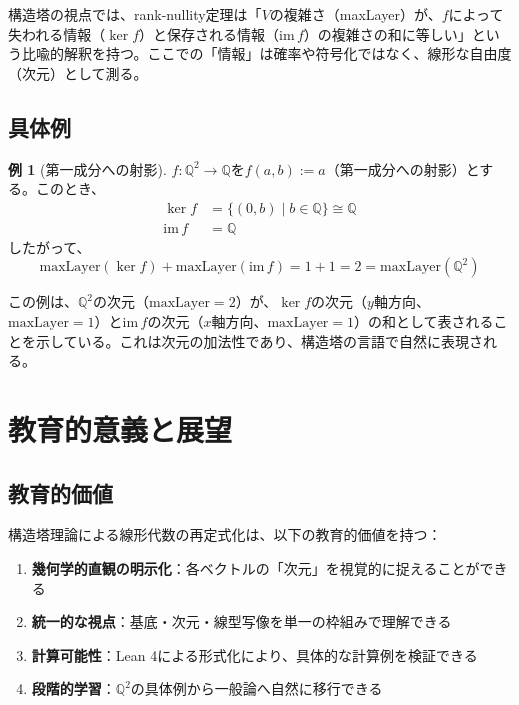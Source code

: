 \documentclass[a4paper,11pt]{ltjsarticle}
\theoremstyle{definition}
\newtheorem{example}[definition]{例}
\begin{document}
構造塔の視点では、rank-nullity定理は「$V$の複雑さ（maxLayer）が、$f$によって失われる情報（$\ker f$）と保存される情報（$\mathrm{im}\, f$）の複雑さの和に等しい」という比喩的解釈を持つ。ここでの「情報」は確率や符号化ではなく、線形な自由度（次元）として測る。

\subsection{具体例}

\begin{example}[第一成分への射影]
$f : \mathbb{Q}^2 \to \mathbb{Q}$を$f(a, b) := a$（第一成分への射影）とする。このとき、
\begin{align*}
\ker f &= \{(0, b) \mid b \in \mathbb{Q}\} \cong \mathbb{Q} \\
\mathrm{im}\, f &= \mathbb{Q}
\end{align*}
したがって、
\[
\mathrm{maxLayer}(\ker f) + \mathrm{maxLayer}(\mathrm{im}\, f) = 1 + 1 = 2 = \mathrm{maxLayer}(\mathbb{Q}^2)
\]
\end{example}

この例は、$\mathbb{Q}^2$の次元（$\mathrm{maxLayer} = 2$）が、$\ker f$の次元（$y$軸方向、$\mathrm{maxLayer} = 1$）と$\mathrm{im}\, f$の次元（$x$軸方向、$\mathrm{maxLayer} = 1$）の和として表されることを示している。これは次元の加法性であり、構造塔の言語で自然に表現される。

\section{教育的意義と展望}

\subsection{教育的価値}

構造塔理論による線形代数の再定式化は、以下の教育的価値を持つ：

\begin{enumerate}
  \item \textbf{幾何学的直観の明示化}：各ベクトルの「次元」を視覚的に捉えることができる
  \item \textbf{統一的な視点}：基底・次元・線型写像を単一の枠組みで理解できる
  \item \textbf{計算可能性}：Lean 4による形式化により、具体的な計算例を検証できる
  \item \textbf{段階的学習}：$\mathbb{Q}^2$の具体例から一般論へ自然に移行できる
\end{enumerate}
\end{document}
